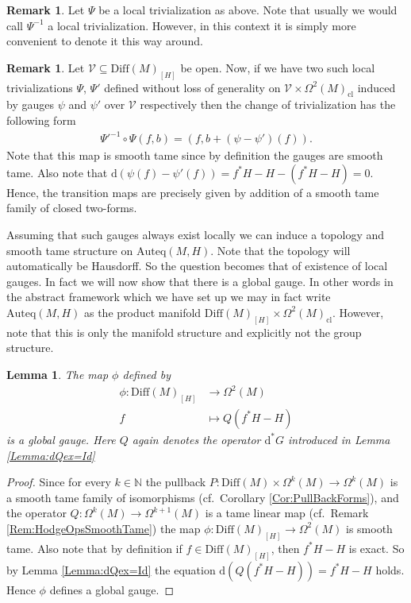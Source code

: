 \documentclass[12pt,a4paper]{article}
\theoremstyle{plain}
\newtheorem{lemma}[theorem]{Lemma}
\theoremstyle{definition}
\newtheorem{remark}[theorem]{Remark}
\newcommand{\N}{\mathbb{N}}
\newcommand{\Forms}[1]{\Omega^{#1}(M)}
\newcommand{\ClForms}[1]{\Forms{#1}_{\mathrm{cl}}}
\newcommand{\SDiff}{\mathrm{Diff}(M)_{[H]}}
\newcommand{\Auteq}{\mathrm{Auteq}(M,H)}
\newcommand{\Vcal}{\mathcal{V}}
\renewcommand{\d}{\mathrm{d}}
\begin{document}
\begin{remark}
Let $\Psi$ be a local trivialization as above. Note that usually we would call $\Psi^{-1}$ a local trivialization. However, in this context it is simply more convenient to denote it this way around.    
\end{remark}

\begin{remark}
\label{Rem:TransFunctAuteq}
Let $\Vcal\subseteq \SDiff$ be open. Now, if we have two such local trivializations $\Psi$, $\Psi'$ defined without loss of generality on $\Vcal\times \ClForms{2}$ induced by gauges $\psi$ and $\psi'$ over $\Vcal$ respectively then the change of trivialization has the following form
\begin{align*}
    \Psi'^{-1}\circ \Psi (f,b)=(f,b+(\psi-\psi')(f)).
\end{align*}
Note that this map is smooth tame since by definition the gauges are smooth tame. Also note that $\d(\psi(f)-\psi'(f))=f^*H-H-(f^*H-H)=0$. Hence, the transition maps are precisely given by addition of a smooth tame family of closed two-forms.
\end{remark}

Assuming that such gauges always exist locally we can induce a topology and smooth tame structure on $\Auteq$. Note that the topology will automatically be Hausdorff.
So the question becomes that of existence of local gauges.
In fact we will now show that there is a global gauge. In other words in the abstract framework which we have set up we may in fact write $\Auteq$ as the product manifold $\SDiff\times \ClForms{2}$. However, note that this is only the manifold structure and explicitly not the group structure.



\begin{lemma}
\label{Lemma:PhiGlobGauge}
The map $\phi$ defined by 
\begin{align*}
    \phi:\SDiff&\longrightarrow \Forms{2}\\
    f&\longmapsto Q(f^*H-H)
\end{align*}
is a global gauge.
Here $Q$ again denotes the operator $\d^*G$ introduced in Lemma \ref{Lemma:dQex=Id}
\end{lemma}
\begin{proof}
Since for every $k\in \N$ the pullback $P:\mathrm{Diff}(M)\times \Forms{k}\to \Forms{k}$ is a smooth tame family of isomorphisms (cf.~Corollary \ref{Cor:PullBackForms}), and the operator $Q:\Forms{k}\to \Forms{k+1}$ is a tame linear map (cf.~Remark \ref{Rem:HodgeOpsSmoothTame}) the map
$\phi:\SDiff\to \Forms{2}$ is smooth tame. Also note that by definition if $f\in \SDiff$, then $f^*H-H$ is exact. So by Lemma \ref{Lemma:dQex=Id} the equation $\d(Q(f^*H-H))=f^*H-H$ holds. Hence $\phi$ defines a global gauge. 
\end{proof}
\end{document}
